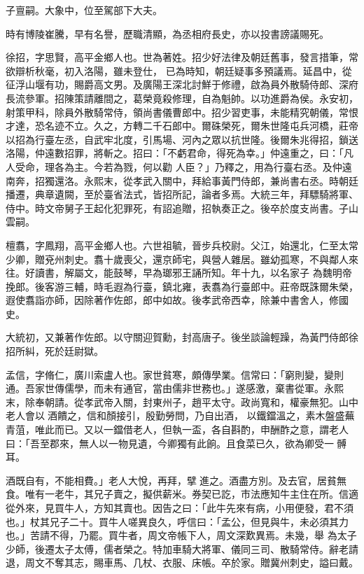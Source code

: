 \begin{pinyinscope}
 子亶嗣。大象中，位至駕部下大夫。



 時有博陵崔騰，早有名譽，歷職清顯，為丞相府長史，亦以投書謗議賜死。



 徐招，字思賢，高平金鄉人也。世為著姓。招少好法律及朝廷舊事，發言措筆，常欲辯析秋毫，初入洛陽，雖未登仕，
 已為時知，朝廷疑事多預議焉。延昌中，從征浮山堰有功，賜爵高文男。及廣陽王深北討鮮于修禮，啟為員外散騎侍郎、深府長流參軍。招陳策請離間之，葛榮竟殺修理，自為魁帥。以功進爵為侯。永安初，射策甲科，除員外散騎常侍，領尚書儀曹郎中。招少習吏事，未能精究朝儀，常恨才達，恐名迹不立。久之，方轉二千石郎中。爾硃榮死，爾朱世隆屯兵河橋，莊帝以招為行臺左丞，自武牢北度，引馬場、河內之眾以抗世隆。後爾朱兆得招，鎖送洛陽，仲遠數招罪，將斬之。招曰：「不虧君命，得死為幸。」仲遠重之，曰：「凡人受命，理各為主。今若為戮，何以勸
 人臣？」乃釋之，用為行臺右丞。及仲遠南奔，招獨還洛。永熙末，從孝武入關中，拜給事黃門侍郎，兼尚書右丞。時朝廷播遷，典章遺闕，至於臺省法式，皆招所記，論者多焉。大統三年，拜驃騎將軍、侍中。時文帝舅子王起化犯罪死，有詔追贈，招執奏正之。後卒於度支尚書。子山雲嗣。



 檀翥，字鳳翔，高平金鄉人也。六世祖毓，晉步兵校尉。父江，始還北，仁至太常少卿，贈兗州刺史。翥十歲喪父，還京師宅，與營人雜居。雖幼孤寒，不與鄰人來往。好讀書，解屬文，能鼓琴，早為瑯邪王誦所知。年十九，以名家子
 為魏明帝挽郎。後客游三輔，時毛遐為行臺，鎮北雍，表翥為行臺郎中。莊帝既誅爾朱榮，遐使翥詣亦師，因除著作佐郎，郎中如故。後孝武帝西幸，除兼中書舍人，修國史。



 大統初，又兼著作佐郎。以守關迎賀勳，封高唐子。後坐談論輕躁，為黃門侍郎徐招所糾，死於廷尉獄。



 孟信，字脩仁，廣川索盧人也。家世貧寒，頗傳學業。信常曰：「窮則變，變則通。吾家世傳儒學，而未有通官，當由儒非世務也。」遂感激，棄書從軍。永熙末，除奉朝請。從孝武帝入關，封東州子，趙平太守。政尚寬和，權豪無犯。山中老人會以酒饋之，信和顏接引，殷勤勞問，乃自出酒，
 以鐵鐺溫之，素木盤盛蕪青菹，唯此而已。又以一鐺借老人，但執一盃，各自斟酌，申酬酢之意，謂老人曰：「吾至郡來，無人以一物見遺，今卿獨有此餉。且食菜已久，欲為卿受一髆耳。



 酒既自有，不能相費。」老人大悅，再拜，擘進之。酒盡方別。及去官，居貧無食。唯有一老牛，其兄子賣之，擬供薪米。券契已訖，市法應知牛主住在所。信適從外來，見買牛人，方知其賣也。因告之曰：「此牛先來有病，小用便發，君不須也。」杖其兄子二十。買牛人嗟異良久，呼信曰：「孟公，但見與牛，未必須其力也。」苦請不得，乃罷。買牛者，周文帝帳下人，周文深歎異焉。未幾，舉
 為太子少師，後遷太子太傅，儒者榮之。特加車騎大將軍、儀同三司、散騎常侍。辭老請退，周文不奪其志，賜車馬、几杖、衣服、床帳。卒於家。贈冀州刺史，謚曰戴。




\end{pinyinscope}
